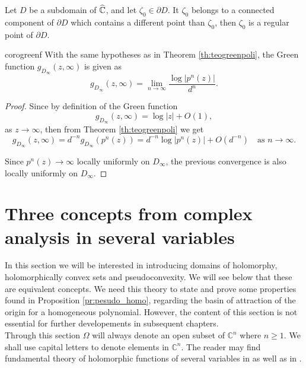 \begin{mycoro}{}{}
Let $D$ be a subdomain of $\widehat{\mathbb{C}}$, and let $\zeta_0\in \partial D$. It $\zeta_0$ belongs to a connected component of $\partial D$ which contains a different point than $\zeta_0$, then $\zeta_0$ is a regular point of $\partial D$.
\end{mycoro}

\begin{mycoro}{}{corogreenf}
With the same hypotheses as in Theorem \ref{th:teogreenpoli}, the Green function $g_{D_\infty}(z,\infty)$ is given as
$$g_{D_\infty}(z,\infty) = \lim_{n\rightarrow \infty} \frac{\log |p^n(z)|}{d^n}.$$
\end{mycoro}

\begin{proof}
Since by definition of the Green function
$$g_{D_\infty}(z,\infty)=\log|z| + O(1),$$
as $z\rightarrow \infty$, then from Theorem \ref{th:teogreenpoli} we get
$$g_{D_\infty}(z,\infty) = d^{-n}g_{D_\infty}(p^n(z)) = d^{-n}\log|p^n(z)| + O(d^{-n}) \quad \text{as }n \rightarrow \infty.$$

Since $p^n(z) \rightarrow \infty$ locally uniformly on $D_\infty$, the previous convergence is also locally uniformly on $D_\infty$.
\end{proof}



\section{Three concepts from complex analysis in several variables}

In this section we will be interested in introducing domains of holomorphy, holomorphically convex sets and pseudoconvexity. We will see below that these are equivalent concepts. We need this theory to state and prove some properties found in Proposition \ref{pr:pesudo_homo}, regarding the basin of attraction of the origin for a homogeneous polynomial. However, the content of this section is not essential for further developements in subsequent chapters.\\

Through this section $\Omega$ will always denote an open subset of $\mathbb{C}^n$ where $n\geq 1$. We shall use capital letters to denote elements in $\mathbb{C}^n$. The reader may find fundamental theory of holomorphic functions of several variables in \cite{gunning} as well as in \cite{hormander}.


